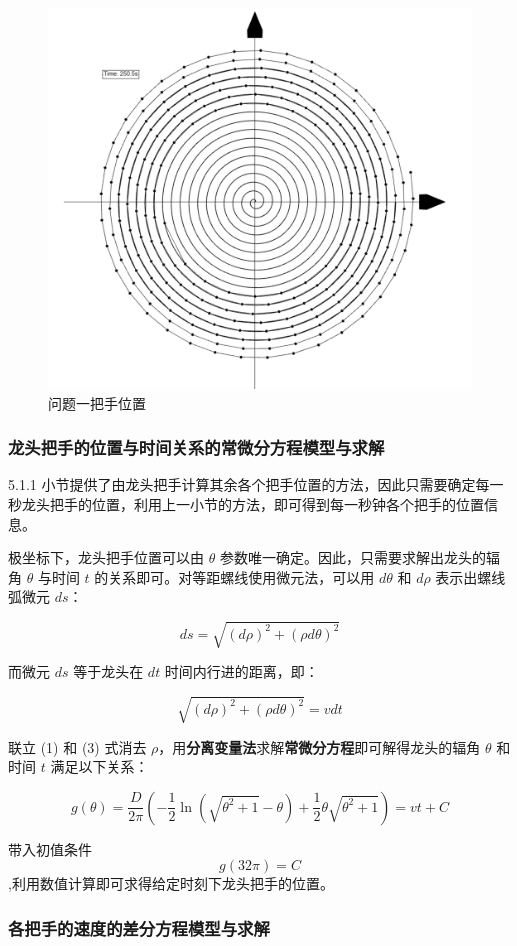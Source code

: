 \documentclass[a4paper]{article}
\begin{document}
		\begin{figure}[H]
			\centering
			\includegraphics[width=0.5\linewidth]{image/Figure_5111.png}
			\caption{问题一把手位置}
			\label{Figure_5111}
		\end{figure}

	\subsubsection{龙头把手的位置与时间关系的常微分方程模型与求解}

		5.1.1 小节提供了由龙头把手计算其余各个把手位置的方法，因此只需要确定每一秒龙头把手的位置，利用上一小节的方法，即可得到每一秒钟各个把手的位置信息。

		极坐标下，龙头把手位置可以由 $\theta$ 参数唯一确定。因此，只需要求解出龙头的辐角 $\theta$ 与时间 $t$ 的关系即可。对等距螺线使用微元法，可以用 $d\theta$ 和 $d\rho$ 表示出螺线弧微元 $ds$：

		$$ ds = \sqrt{(d\rho)^2 + (\rho d\theta) ^ 2}$$

		而微元 $ds$ 等于龙头在 $dt$ 时间内行进的距离，即：

		\begin{equation}
			\sqrt{(d\rho)^2 + (\rho d\theta) ^ 2} = vdt
		\end{equation}

		联立 (1) 和 (3) 式消去 $\rho$，用\textbf{分离变量法}求解\textbf{常微分方程}即可解得龙头的辐角 $\theta$ 和时间 $t$ 满足以下关系：

		\begin{equation}
			g(\theta) = \frac{D}{2\pi}(-\frac{1}{2}\ln(\sqrt{\theta^2+1}-\theta)+\frac{1}{2}\theta\sqrt{\theta^2+1})=vt+C
		\end{equation}


		带入初值条件$$g(32  \pi) = C$$,利用数值计算即可求得给定时刻下龙头把手的位置。

	\subsubsection{各把手的速度的差分方程模型与求解}
\end{document}
